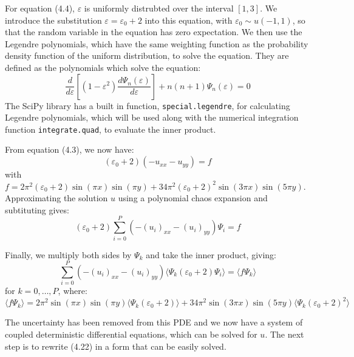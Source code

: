 \documentclass[11pt]{article}
\numberwithin{equation}{section}
\begin{document}
For equation (4.4), $\varepsilon$ is uniformly distrubted over the interval $[1,3]$. We introduce the substitution $\varepsilon = \varepsilon_0 + 2$ into this equation, with $\varepsilon_0 \sim u(-1,1)$, so that the random variable in the equation has zero expectation. We then use the Legendre polynomials, which have the same weighting function as the probability density function of the uniform distribution, to solve the equation. They are defined as the polynomials which solve the equation:
\begin{equation}
\frac{d}{d\varepsilon} \left[ (1-\varepsilon^2) \frac{d\Psi_n(\varepsilon)}{d\varepsilon} \right] + n(n+1) \Psi_n(\varepsilon) = 0 
\end{equation}
The SciPy library has a built in function, \texttt{special.legendre}, for calculating Legendre polynomials, which will be used along with the numerical integration function \texttt{integrate.quad}, to evaluate the inner product. 

From equation (4.3), we now have:
\begin{equation}
(\varepsilon_0+2)(- u_{xx} - u_{yy}) = f
\end{equation}
with $f = 2\pi^2 (\varepsilon_0 +2) \sin(\pi x) \sin(\pi y)+ 34 \pi^2 (\varepsilon_0 + 2)^2 \sin(3 \pi x) \sin(5 \pi y)$. Approximating the solution $u$ using a polynomial chaos expansion and subtituting gives:
\begin{equation}
(\varepsilon_0 + 2) \sum_{i=0}^P (-(u_i)_{xx} -(u_i)_{yy}) \Psi_i = f
\end{equation}

Finally, we multiply both sides by $\Psi_k$ and take the inner product, giving:
\begin{equation}
\sum_{i=0}^P (-(u_i)_{xx} -(u_i)_{yy}) \langle \Psi_k (\varepsilon_0 + 2) \Psi_i \rangle = \langle f \Psi_k \rangle
\end{equation}
for $k = 0, \dots, P$, where:
\begin{equation}
\langle f \Psi_k \rangle = 2\pi^2 \sin(\pi x) \sin(\pi y) \langle \Psi_k (\varepsilon_0 + 2) \rangle
+ 34 \pi^2 \sin(3 \pi x) \sin(5 \pi y) \langle \Psi_k (\varepsilon_0 + 2)^2 \rangle
\end{equation}

The uncertainty has been removed from this PDE and we now have a system of coupled deterministic differential equations, which can be solved for $u$. The next step is to rewrite (4.22) in a form that can be easily solved.
\end{document}
